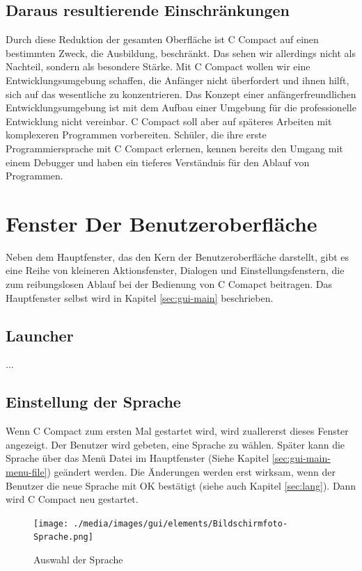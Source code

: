 \subsection{Daraus resultierende Einschränkungen}
Durch diese Reduktion der gesamten Oberfläche ist C Compact auf einen bestimmten Zweck, die Ausbildung, beschränkt. Das sehen wir allerdings nicht als Nachteil, sondern als besondere Stärke. Mit C Compact wollen wir eine Entwicklungsumgebung schaffen, die Anfänger nicht überfordert und ihnen hilft, sich auf das wesentliche zu konzentrieren.
Das Konzept einer anfängerfreundlichen Entwicklungsumgebung ist mit dem Aufbau einer Umgebung für die professionelle Entwicklung nicht vereinbar. C Compact soll aber auf späteres Arbeiten mit komplexeren Programmen vorbereiten. Schüler, die ihre erste Programmiersprache mit C Compact erlernen, kennen bereits den Umgang mit einem Debugger und haben ein tieferes Verständnis für den Ablauf von Programmen.

\section{Fenster Der Benutzeroberfläche}
Neben dem Hauptfenster, das den Kern der Benutzeroberfläche darstellt, gibt es eine Reihe von kleineren Aktionsfenster, Dialogen und Einstellungsfenstern, die zum reibungslosen Ablauf bei der Bedienung von C Comapct beitragen. Das Hauptfenster selbst wird in Kapitel \ref{sec:gui-main} beschrieben.

\subsection{Launcher}
\label{sec:win-launcher}
...

\subsection{Einstellung der Sprache}
\label{sec:win-lang}
Wenn C Compact zum ersten Mal gestartet wird, wird zuallererst dieses Fenster angezeigt. Der Benutzer wird gebeten, eine Sprache zu wählen. Später kann die Sprache über das Menü \glqq{}Datei\grqq{} im Hauptfenster (Siehe Kapitel \ref{sec:gui-main-menu-file}) geändert werden. Die Änderungen werden erst wirksam, wenn der Benutzer die neue Sprache mit \glqq{}OK\grqq{} bestätigt (siehe auch Kapitel \ref{sec:lang}). Dann wird C Compact neu gestartet.

\begin{figure}[htp]
\centering
\texttt{[image: ./media/images/gui/elements/Bildschirmfoto-Sprache.png]}
\caption{Auswahl der Sprache}
\label{fig:win-lang}
\end{figure}

